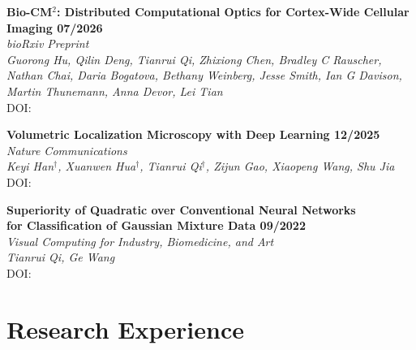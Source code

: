 \documentclass[letterpaper, 11pt]{article}
\newcommand{\subsectionvspace}{\vspace{8pt}}
\begin{document}
    \textbf{Bio-CM$^{2}$: Distributed Computational Optics for Cortex-Wide Cellular Imaging \hfill 07/2026} \\
    \textit{bioRxiv Preprint} \\
    \textit{Guorong Hu, Qilin Deng, \textup{Tianrui Qi}, Zhixiong Chen, Bradley C Rauscher, Nathan Chai, Daria Bogatova, Bethany Weinberg, Jesse Smith, Ian G Davison, Martin Thunemann, Anna Devor, Lei Tian} \\
    DOI: \href{https://doi.org/10.64898/2026.07.27.740823}{}

    \subsectionvspace

    \textbf{Volumetric Localization Microscopy with Deep Learning \hfill 12/2025}\\
    \textit{Nature Communications} \\
    \textit{
        Keyi Han$^\dag$, 
        Xuanwen Hua$^\dag$, 
        \textup{Tianrui Qi}$^\dag$, 
        Zijun Gao, 
        Xiaopeng Wang, 
        Shu Jia
    } \\
    DOI: \href{https://doi.org/10.1038/s41467-025-65941-3}{}

    \subsectionvspace

    \textbf{Superiority of Quadratic over Conventional Neural Networks \\ for Classification of Gaussian Mixture Data \hfill 09/2022} \\
    \textit{Visual Computing for Industry, Biomedicine, and Art} \\
    \textit{
        \textup{Tianrui Qi}, 
        Ge Wang
    } \\
    DOI: \href{https://doi.org/10.1186/s42492-022-00118-z}{}


\section{Research Experience}
\end{document}
